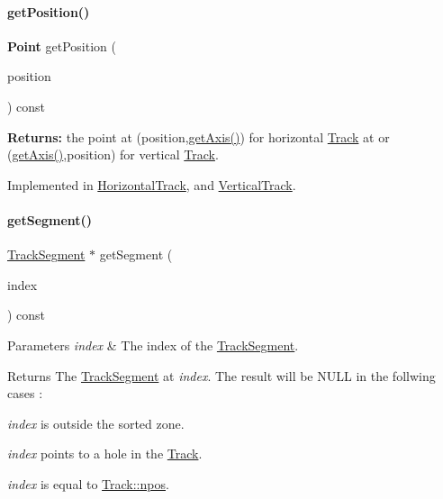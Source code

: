 \paragraph{\texorpdfstring{get\+Position()}{getPosition()}}
{\footnotesize\ttfamily \textbf{ Point} get\+Position (\begin{DoxyParamCaption}\item[{\textbf{ Db\+U\+::\+Unit}}]{position }\end{DoxyParamCaption}) const\hspace{0.3cm}{\ttfamily [pure virtual]}}

{\bfseries Returns\+:} the point at {\ttfamily }(position,\mbox{\hyperlink{classKite_1_1Track_ab5b5aaa5b318369feee6003dbad039c2}{get\+Axis()}}) for horizontal \mbox{\hyperlink{classKite_1_1Track}{Track}} at or {\ttfamily }(\mbox{\hyperlink{classKite_1_1Track_ab5b5aaa5b318369feee6003dbad039c2}{get\+Axis()}},position) for vertical \mbox{\hyperlink{classKite_1_1Track}{Track}}. 

Implemented in \mbox{\hyperlink{classKite_1_1HorizontalTrack_a6ab4f8026e4500918aa8721f1199f8b6}{Horizontal\+Track}}, and \mbox{\hyperlink{classKite_1_1VerticalTrack_a6ab4f8026e4500918aa8721f1199f8b6}{Vertical\+Track}}.

\mbox{\label{classKite_1_1Track_acb93796a96c9737133fb5d90837ab81d}} 
\paragraph{\texorpdfstring{get\+Segment()}{getSegment()}\hspace{0.1cm}{\footnotesize\ttfamily [1/2]}}
{\footnotesize\ttfamily \mbox{\hyperlink{classKite_1_1TrackSegment}{Track\+Segment}} $\ast$ get\+Segment (\begin{DoxyParamCaption}\item[{size\+\_\+t}]{index }\end{DoxyParamCaption}) const}


\begin{DoxyParams}{Parameters}
{\em index} & The index of the \mbox{\hyperlink{classKite_1_1TrackSegment}{Track\+Segment}}. \\
\hline
\end{DoxyParams}
\begin{DoxyReturn}{Returns}
The \mbox{\hyperlink{classKite_1_1TrackSegment}{Track\+Segment}} at {\itshape index}. The result will be {\ttfamily N\+U\+LL} in the follwing cases \+:
\begin{DoxyItemize}
\item {\itshape index} is outside the sorted zone.
\item {\itshape index} points to a hole in the \mbox{\hyperlink{classKite_1_1Track}{Track}}.
\item {\itshape index} is equal to \mbox{\hyperlink{classKite_1_1Track_ae0070ea45b2592ce3701ab9e486e58a0}{Track\+::npos}}. 
\end{DoxyItemize}
\end{DoxyReturn}


